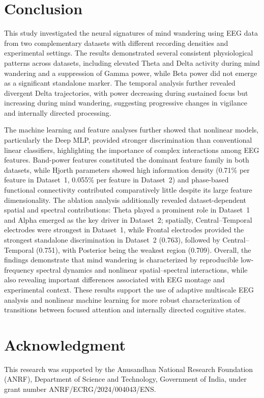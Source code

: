\documentclass[conference]{IEEEtran}
\begin{document}
\section{Conclusion}

This study investigated the neural signatures of mind wandering using EEG data from two complementary datasets with different recording densities and experimental settings. The results demonstrated several consistent physiological patterns across datasets, including elevated Theta and Delta activity during mind wandering and a suppression of Gamma power, while Beta power did not emerge as a significant standalone marker. The temporal analysis further revealed divergent Delta trajectories, with power decreasing during sustained focus but increasing during mind wandering, suggesting progressive changes in vigilance and internally directed processing.

The machine learning and feature analyses further showed that nonlinear models, particularly the Deep MLP, provided stronger discrimination than conventional linear classifiers, highlighting the importance of complex interactions among EEG features. Band-power features constituted the dominant feature family in both datasets, while Hjorth parameters showed high information density (0.71\% per feature in Dataset~1, 0.055\% per feature in Dataset~2) and phase-based functional connectivity contributed comparatively little despite its large feature dimensionality. The ablation analysis additionally revealed dataset-dependent spatial and spectral contributions: Theta played a prominent role in Dataset~1 and Alpha emerged as the key driver in Dataset~2; spatially, Central--Temporal electrodes were strongest in Dataset~1, while Frontal electrodes provided the strongest standalone discrimination in Dataset~2 (0.763), followed by Central--Temporal (0.751), with Posterior being the weakest region (0.709). Overall, the findings demonstrate that mind wandering is characterized by reproducible low-frequency spectral dynamics and nonlinear spatial--spectral interactions, while also revealing important differences associated with EEG montage and experimental context. These results support the use of adaptive multiscale EEG analysis and nonlinear machine learning for more robust characterization of transitions between focused attention and internally directed cognitive states.
\section*{Acknowledgment}
This research was supported by the Anusandhan National Research Foundation (ANRF), Department of Science and Technology, Government of India, under grant number ANRF/ECRG/2024/004043/ENS.
\vspace{-2mm}


\end{document}
